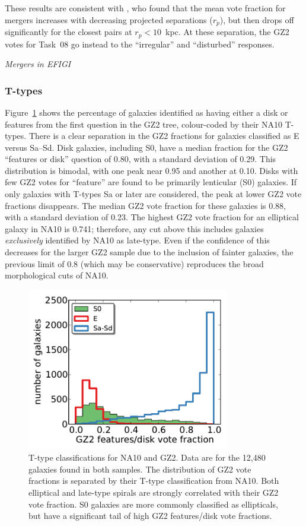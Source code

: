 \documentclass[useAMS,usenatbib]{mn2e}
\begin{document}
These results are consistent with \citet{cas13}, who found that the mean vote fraction for mergers increases with decreasing projected separations ($r_p$), but then drops off significantly for the closest pairs at $r_p < 10$~kpc. At these separation, the GZ2 votes for Task~08 go instead to the ``irregular'' and ``disturbed'' responses. 

{\em Mergers in EFIGI}

\subsubsection{T-types}

Figure~\ref{fig-na_ttype} shows the percentage of galaxies identified as having either a disk or features from the first question in the GZ2 tree, colour-coded by their NA10 T-types. There is a clear separation in the GZ2 fractions for galaxies classified as E versus Sa--Sd. Disk galaxies, including S0, have a median fraction for the GZ2 ``features or disk'' question of 0.80, with a standard deviation of 0.29. This distribution is bimodal, with one peak near 0.95 and another at 0.10. Disks with few GZ2 votes for ``feature'' are found to be primarily lenticular (S0) galaxies. If only galaxies with T-types Sa or later are considered, the peak at lower GZ2 vote fractions disappears. The median GZ2 vote fraction for these galaxies is 0.88, with a standard deviation of 0.23. The highest GZ2 vote fraction for an elliptical galaxy in NA10 is 0.741; therefore, any cut above this includes galaxies {\it exclusively} identified by NA10 as late-type. Even if the confidence of this decreases for the larger GZ2 sample due to the inclusion of fainter galaxies, the previous limit of 0.8 (which may be conservative) reproduces the broad morphological cuts of NA10. 

\begin{figure}
\includegraphics[angle=0,width=3.5in]{figures/na_ttype.pdf}
\caption{T-type classifications for NA10 and GZ2. Data are for the 12,480 galaxies found in both samples. The distribution of GZ2 vote fractions is separated by their T-type classification from NA10. Both elliptical and late-type spirals are strongly correlated with their GZ2 vote fraction. S0 galaxies are more commonly classified as ellipticals, but have a significant tail of high GZ2 features/disk vote fractions. 
\label{fig-na_ttype}}
\end{figure}
\end{document}
